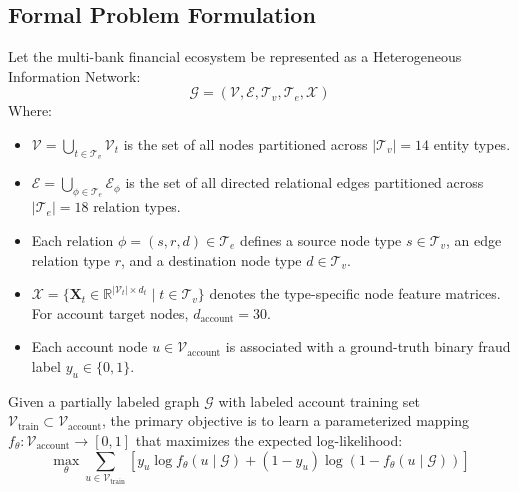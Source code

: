 \documentclass[conference]{IEEEtran}
\begin{document}
\subsection{Formal Problem Formulation}
Let the multi-bank financial ecosystem be represented as a Heterogeneous Information Network:
\begin{equation}
\mathcal{G} = (\mathcal{V}, \mathcal{E}, \mathcal{T}_v, \mathcal{T}_e, \mathcal{X})
\label{eq:graph_def}
\end{equation}
Where:
\begin{itemize}
    \item $\mathcal{V} = \bigcup_{t \in \mathcal{T}_v} \mathcal{V}_t$ is the set of all nodes partitioned across $|\mathcal{T}_v| = 14$ entity types.
    \item $\mathcal{E} = \bigcup_{\phi \in \mathcal{T}_e} \mathcal{E}_\phi$ is the set of all directed relational edges partitioned across $|\mathcal{T}_e| = 18$ relation types.
    \item Each relation $\phi = (s, r, d) \in \mathcal{T}_e$ defines a source node type $s \in \mathcal{T}_v$, an edge relation type $r$, and a destination node type $d \in \mathcal{T}_v$.
    \item $\mathcal{X} = \{\mathbf{X}_t \in \mathbb{R}^{|\mathcal{V}_t| \times d_t} \mid t \in \mathcal{T}_v\}$ denotes the type-specific node feature matrices. For account target nodes, $d_{\text{account}} = 30$.
    \item Each account node $u \in \mathcal{V}_{\text{account}}$ is associated with a ground-truth binary fraud label $y_u \in \{0, 1\}$.
\end{itemize}

Given a partially labeled graph $\mathcal{G}$ with labeled account training set $\mathcal{V}_{\text{train}} \subset \mathcal{V}_{\text{account}}$, the primary objective is to learn a parameterized mapping $f_\theta: \mathcal{V}_{\text{account}} \to [0, 1]$ that maximizes the expected log-likelihood:
\begin{equation}
\max_\theta \sum_{u \in \mathcal{V}_{\text{train}}} \left[ y_u \log f_\theta(u \mid \mathcal{G}) + (1 - y_u) \log (1 - f_\theta(u \mid \mathcal{G})) \right]
\label{eq:objective}
\end{equation}
\end{document}
